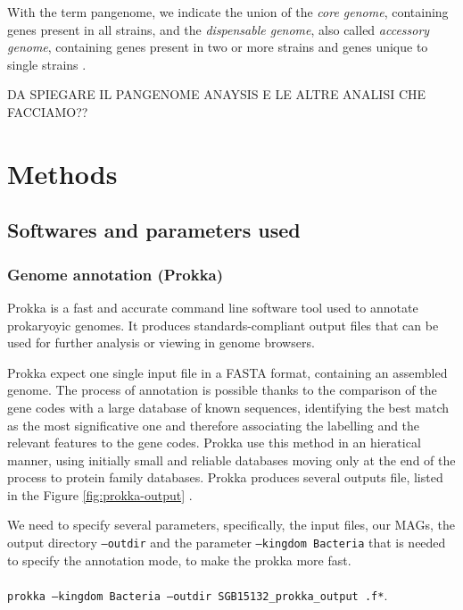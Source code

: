 \documentclass[a4paper,titlepage]{book}
\newcommand{\code}[1]{\colorbox{light-gray}{\texttt{#1}}}
\begin{document}
With the term pangenome, we indicate the union of the \textit{core genome}, containing genes present in all strains, and the \textit{dispensable genome}, also called \textit{accessory genome}, containing genes present in two or more strains and genes unique to single strains \cite{Medini}.


DA SPIEGARE IL PANGENOME ANAYSIS E LE ALTRE ANALISI CHE FACCIAMO??



\chapter{Methods}
\section{Softwares and parameters used}
\subsection{Genome annotation (Prokka)}

Prokka is a fast and accurate command line software tool used to annotate prokaryoyic genomes.  It produces standards-compliant output files that can be used for further analysis or viewing in genome browsers.

Prokka expect one single input file in a FASTA format, containing an assembled genome. The process of annotation is possible thanks to the comparison of the gene codes with a large database of known sequences, identifying the best match as the most significative one and therefore associating the labelling and the relevant features to the gene codes. Prokka use this method in an hieratical manner, using initially small and reliable databases moving only at the end of the process to protein family databases.
Prokka produces several outputs file, listed in the Figure \ref{fig:prokka-output}  \cite{Prokka}.

We need to specify several parameters, specifically, the input files, our MAGs, the output directory \code{--outdir} and the parameter \code{--kingdom Bacteria} that is needed to specify the annotation mode, to make the prokka more fast.
\\ \newline \\
\code{prokka --kingdom Bacteria --outdir SGB15132\_prokka\_output .f*}.

\end{document}
